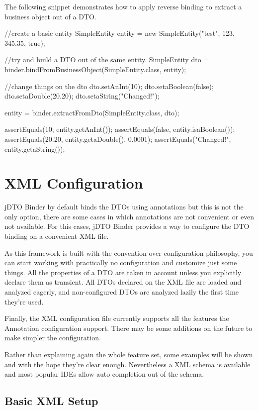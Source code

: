 \documentclass[11pt]{article}
\newcommand{\JDTO}{jDTO Binder\xspace}
\begin{document}
The following snippet demonstrates how to apply reverse binding to extract a business object out of a DTO.



\begin{java}
//create a basic entity
SimpleEntity entity = new SimpleEntity("test", 123, 345.35, true);

//try and build a DTO out of the same entity.
SimpleEntity dto = 
    binder.bindFromBusinessObject(SimpleEntity.class, entity);

//change things on the dto
dto.setAnInt(10);
dto.setaBoolean(false);
dto.setaDouble(20.20);
dto.setaString("Changed!");

entity = binder.extractFromDto(SimpleEntity.class, dto);


assertEquals(10, entity.getAnInt());
assertEquals(false, entity.isaBoolean());
assertEquals(20.20, entity.getaDouble(), 0.0001);
assertEquals("Changed!", entity.getaString());
\end{java}



\section{XML Configuration}

\JDTO by default binds the DTOs using annotations but this is not the only option, there are some cases in which annotations are not convenient or even not available. For this cases, \JDTO provides a way to configure the DTO binding on a convenient XML file.

As this framework is built with the convention over configuration philosophy, you can start working with practically no configuration and customize just some things. All the properties of a DTO are taken in account unless you explicitly declare them as transient. All DTOs declared on the XML file are loaded and analyzed eagerly, and non-configured DTOs are analyzed lazily the first time they're used.


Finally, the XML configuration file currently supports all the features the Annotation configuration support. There may be some additions on the future to make simpler the configuration.


Rather than explaining again the whole feature set, some examples will be shown and with the hope they're clear enough. Nevertheless a XML schema is available and most popular IDEs allow auto completion out of the schema.


\subsection{Basic XML Setup}
\end{document}
